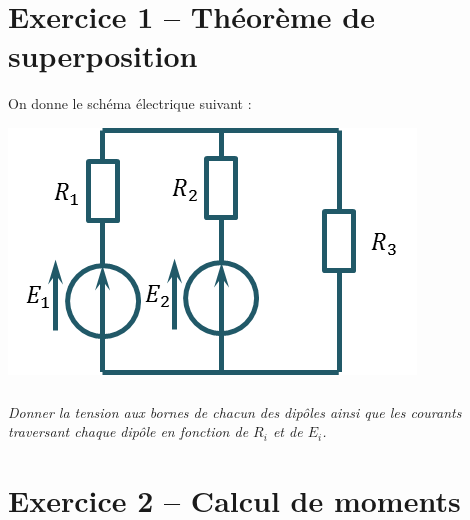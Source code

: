 \documentclass[10pt,fleqn]{book} %
\begin{document}

\vspace{8cm}
\pagestyle{fancy}
\thispagestyle{plain}


\def\columnseprulecolor{\color{ocre}}
\setlength{\columnseprule}{0.4pt} 
\begin{multicols}{2}

\section*{Exercice 1 -- Théorème de superposition}
On donne le schéma électrique suivant :
\begin{center}
\includegraphics[width=\linewidth]{images/fig_01}
\end{center}


\subparagraph{}
\textit{Donner la tension aux bornes de chacun des dipôles ainsi que les courants traversant chaque dipôle en fonction de $R_i$ et de $E_i$.}


\section*{Exercice 2 -- Calcul de moments}


\end{multicols}
\end{document}

